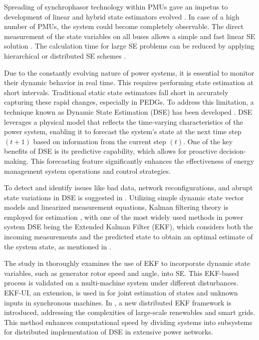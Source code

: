 Spreading of synchrophasor technology within PMUs gave an impetus to development of linear and hybrid state estimators evolved \autocite{1717598, BI20081343, 6878488}. In case of a high number of PMUs, the system could become completely observable. The direct measurement of the state variables on all buses allows a simple and fast linear SE solution \autocite{8620530}. The calculation time for large SE problems can be reduced by applying hierarchical or distributed SE schemes \autocite{7182780, 4162601}.

Due to the constantly evolving nature of power systems, it is essential to monitor their dynamic behavior in real time. This requires performing state estimation at short intervals. Traditional static state estimators fall short in accurately capturing these rapid changes, especially in PEDGs. To address this limitation, a technique known as Dynamic State Estimation (DSE) has been developed \autocite{1099844, 4074246}. DSE leverages a physical model that reflects the time-varying characteristics of the power system, enabling it to forecast the system's state at the next time step $(t+1)$ based on information from the current step $(t)$. One of the key benefits of DSE is its predictive capability, which allows for proactive decision-making. This forecasting feature significantly enhances the effectiveness of energy management system operations and control strategies.


To detect and identify issues like bad data, network reconfigurations, and abrupt state variations in DSE is suggested in \autocite{Nishiya1982}. Utilizing simple dynamic state vector models and linearized measurement equations, Kalman filtering theory is employed for estimation \autocite{Leite1983}, with one of the most widely used methods in power system DSE being the Extended Kalman Filter (EKF), which considers both the incoming measurements and the predicted state to obtain an optimal estimate of the system state, as mentioned in \autocite{Mandal1995}.

The study in \autocite{4510059} thoroughly examines the use of EKF to incorporate dynamic state variables, such as generator rotor speed and angle, into SE. This EKF-based process is validated on a multi-machine system under different disturbances. EKF-UI, an extension, is used in \autocite{5871327} for joint estimation of states and unknown inputs in synchronous machines. In \autocite{6024863}, a new distributed EKF framework is introduced, addressing the complexities of large-scale renewables and smart grids. This method enhances computational speed by dividing systems into subsystems for distributed implementation of DSE in extensive power networks.


